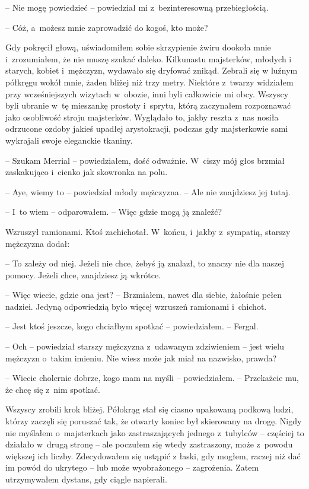 \documentclass[oneside,polish,11pt,sfheadings]{mwbk}
\begin{document}
-- Nie mogę powiedzieć -- powiedział mi z~bezinteresowną przebiegłością.

-- Cóż, a~możesz mnie zaprowadzić do kogoś, kto może?

Gdy pokręcił głową, uświadomiłem sobie skrzypienie żwiru dookoła mnie i~zrozumiałem, że nie muszę szukać daleko. Kilkunastu majsterków, młodych
i starych, kobiet i~mężczyzn, wydawało się dryfować znikąd. Zebrali się
w luźnym półkręgu wokół mnie, żaden bliżej niż trzy metry. Niektóre z~twarzy widziałem przy wcześniejszych wizytach w~obozie, inni byli
całkowicie mi obcy. Wszyscy byli ubranie w~tę mieszankę prostoty i~sprytu, którą zaczynałem rozpoznawać jako osobliwość stroju majsterków.
Wyglądało to, jakby reszta z~nas nosiła odrzucone ozdoby jakieś upadłej
arystokracji, podczas gdy majsterkowie sami wykrajali swoje eleganckie
tkaniny.

-- Szukam Merrial -- powiedziałem, dość odważnie. W~ciszy mój głos brzmiał
zaskakująco i~cienko jak skowronka na polu.

-- Aye, wiemy to -- powiedział młody mężczyzna. -- Ale nie znajdziesz jej
tutaj.

-- I~to wiem -- odparowałem. -- Więc gdzie mogą ją znaleźć?

Wzruszył ramionami. Ktoś zachichotał. W~końcu, i~jakby z~sympatią,
starszy mężczyzna dodał: 

-- To zależy od niej. Jeżeli nie chce, żebyś ją
znalazł, to znaczy nie dla naszej pomocy. Jeżeli chce, znajdziesz ją
wkrótce.

-- Więc wiecie, gdzie ona jest? -- Brzmiałem, nawet dla siebie, żałośnie
pełen nadziei. Jedyną odpowiedzią było więcej wzruszeń ramionami i~chichot.

-- Jest ktoś jeszcze, kogo chciałbym spotkać -- powiedziałem. -- Fergal.

-- Och -- powiedział starszy mężczyzna z~udawanym zdziwieniem -- jest wielu
mężczyzn o~takim imieniu. Nie wiesz może jak miał na nazwisko, prawda?

-- Wiecie cholernie dobrze, kogo mam na myśli -- powiedziałem. -- Przekażcie mu, że chcę się z~nim spotkać.

Wszyscy zrobili krok bliżej. Półokrąg stał się ciasno upakowaną podkową
ludzi, którzy zaczęli się poruszać tak, że otwarty koniec był skierowany na
drogę. Nigdy nie myślałem o~majsterkach jako zastraszających jednego z~tubylców -- częściej to działało w~drugą stronę -- ale poczułem się wtedy
zastraszony, może z~powodu większej ich liczby. Zdecydowałem się ustąpić
z łaski, gdy mogłem, raczej niż dać im powód do ukrytego -- lub może
wyobrażonego -- zagrożenia. Zatem utrzymywałem dystans, gdy ciągle
napierali.
\end{document}
